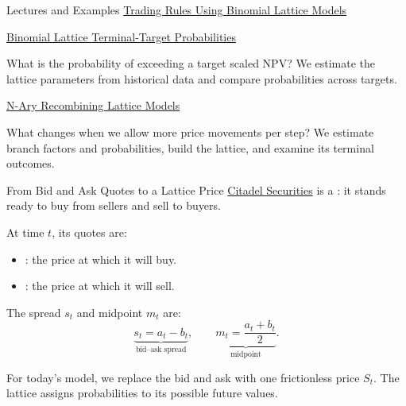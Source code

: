 \documentclass[aspectratio=169,11pt]{beamer}
\begin{document}
\begin{frame}{Lectures and Examples}
\textbf{}
  \href{https://github.com/varnerlab/CHEME-5660-CourseRepository-Fall-2026/blob/main/lectures/week-4/L4a/CHEME-5660-L4a-Lecture-LatticeModel-TradeRule-Fall-2026.ipynb}{Trading Rules Using Binomial Lattice Models}

  \vspace{1.1em}
  \textbf{}
  \href{https://github.com/varnerlab/CHEME-5660-CourseRepository-Fall-2026/blob/main/lectures/week-4/L4a/CHEME-5660-L4a-Example-CumulativeProbabilityLattice-Fall-2026.ipynb}{Binomial Lattice Terminal-Target Probabilities}

  What is the probability of exceeding a target scaled NPV? We estimate the
  lattice parameters from historical data and compare probabilities across targets.

  \vspace{1.1em}
  \textbf{}
  \href{https://github.com/varnerlab/CHEME-5660-CourseRepository-Fall-2026/blob/main/lectures/week-4/L4a/CHEME-5660-L4a-Example-N-Ary-Lattice-Fall-2026.ipynb}{N-Ary Recombining Lattice Models}

  What changes when we allow more price movements per step? We estimate branch
  factors and probabilities, build the lattice, and examine its terminal outcomes.
\end{frame}

\begin{frame}{From Bid and Ask Quotes to a Lattice Price}
\href{https://www.citadelsecurities.com/who-we-are/}{Citadel Securities}
  is a : it stands ready to buy from sellers and sell to buyers.

  \vspace{0.6em}
  At time $t$, its quotes are:
  \begin{itemize}\setlength{\itemsep}{0.4em}
    \item {}: the price at which it will buy.
    \item {}: the price at which it will sell.
  \end{itemize}

  The spread $s_t$ and midpoint $m_t$ are:
  \[
    \underbrace{s_t=a_t-b_t}_{\text{bid--ask spread}},
    \qquad
    \underbrace{m_t=\frac{a_t+b_t}{2}}_{\text{midpoint}}.
  \]

  For today's model, we replace the bid and ask with one frictionless price
  $S_t$. The lattice assigns probabilities to its possible future values.
\end{frame}
\end{document}
